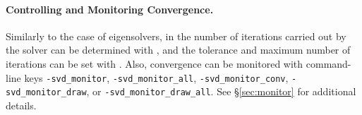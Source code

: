 \paragraph{Controlling and Monitoring Convergence.}

Similarly to the case of eigensolvers, in  the number of iterations carried out by the solver can be determined with , and the tolerance and maximum number of iterations can be set with . Also, convergence can be monitored with command-line keys \Verb!-svd_monitor!, \Verb!-svd_monitor_all!, \Verb!-svd_monitor_conv!, \Verb!-svd_monitor_draw!, or \Verb!-svd_monitor_draw_all!. See \S\ref{sec:monitor} for additional details.

